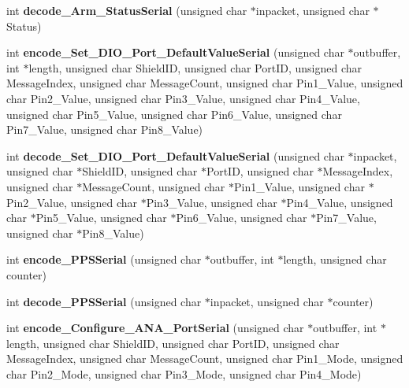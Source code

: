 \begin{DoxyCompactItemize}
\item 
\mbox{\label{classSerialMessageHandler_a81454569ed84f997130c6008d23c305b}} 
int {\bfseries decode\+\_\+\+Arm\+\_\+\+Status\+Serial} (unsigned char $\ast$inpacket, unsigned char $\ast$Status)
\item 
\mbox{\label{classSerialMessageHandler_a5069bc2a552f86672409054b36adfb17}} 
int {\bfseries encode\+\_\+\+Set\+\_\+\+D\+I\+O\+\_\+\+Port\+\_\+\+Default\+Value\+Serial} (unsigned char $\ast$outbuffer, int $\ast$length, unsigned char Shield\+ID, unsigned char Port\+ID, unsigned char Message\+Index, unsigned char Message\+Count, unsigned char Pin1\+\_\+\+Value, unsigned char Pin2\+\_\+\+Value, unsigned char Pin3\+\_\+\+Value, unsigned char Pin4\+\_\+\+Value, unsigned char Pin5\+\_\+\+Value, unsigned char Pin6\+\_\+\+Value, unsigned char Pin7\+\_\+\+Value, unsigned char Pin8\+\_\+\+Value)
\item 
\mbox{\label{classSerialMessageHandler_a2bd74dfc78f5327e0a9098a7dcb45c19}} 
int {\bfseries decode\+\_\+\+Set\+\_\+\+D\+I\+O\+\_\+\+Port\+\_\+\+Default\+Value\+Serial} (unsigned char $\ast$inpacket, unsigned char $\ast$Shield\+ID, unsigned char $\ast$Port\+ID, unsigned char $\ast$Message\+Index, unsigned char $\ast$Message\+Count, unsigned char $\ast$Pin1\+\_\+\+Value, unsigned char $\ast$Pin2\+\_\+\+Value, unsigned char $\ast$Pin3\+\_\+\+Value, unsigned char $\ast$Pin4\+\_\+\+Value, unsigned char $\ast$Pin5\+\_\+\+Value, unsigned char $\ast$Pin6\+\_\+\+Value, unsigned char $\ast$Pin7\+\_\+\+Value, unsigned char $\ast$Pin8\+\_\+\+Value)
\item 
\mbox{\label{classSerialMessageHandler_a10c8e8c8a372d1ab7dee71e519603b8c}} 
int {\bfseries encode\+\_\+\+P\+P\+S\+Serial} (unsigned char $\ast$outbuffer, int $\ast$length, unsigned char counter)
\item 
\mbox{\label{classSerialMessageHandler_af4005ad84fc5e22449dc4a4a2785a5eb}} 
int {\bfseries decode\+\_\+\+P\+P\+S\+Serial} (unsigned char $\ast$inpacket, unsigned char $\ast$counter)
\item 
\mbox{\label{classSerialMessageHandler_a465a338fea61f2ff7bf42a17a2246310}} 
int {\bfseries encode\+\_\+\+Configure\+\_\+\+A\+N\+A\+\_\+\+Port\+Serial} (unsigned char $\ast$outbuffer, int $\ast$length, unsigned char Shield\+ID, unsigned char Port\+ID, unsigned char Message\+Index, unsigned char Message\+Count, unsigned char Pin1\+\_\+\+Mode, unsigned char Pin2\+\_\+\+Mode, unsigned char Pin3\+\_\+\+Mode, unsigned char Pin4\+\_\+\+Mode)

\end{DoxyCompactItemize}
